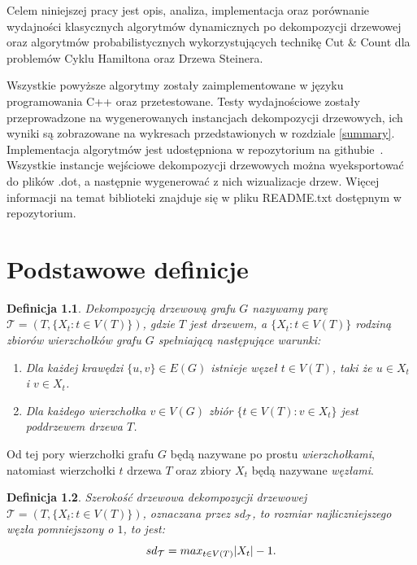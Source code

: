 \documentclass[12pt, oneside]{report}
\newtheorem{definition}{Definicja}
\begin{document}
Celem niniejszej pracy jest opis, analiza, implementacja oraz porównanie wydajności klasycznych algorytmów dynamicznych po dekompozycji drzewowej oraz algorytmów probabilistycznych wykorzystujących technikę Cut \& Count dla problemów Cyklu Hamiltona oraz Drzewa Steinera. 

Wszystkie powyższe algorytmy zostały zaimplementowane w języku programowania C++ oraz przetestowane. Testy wydajnościowe zostały przeprowadzone na wygenerowanych instancjach dekompozycji drzewowych, ich wyniki są zobrazowane na wykresach przedstawionych w rozdziale \ref{summary}. Implementacja algorytmów jest udostępniona w repozytorium na githubie~\cite{github}. Wszystkie instancje wejściowe dekompozycji drzewowych można wyeksportować do plików .dot, a następnie wygenerować z nich wizualizacje drzew. Więcej informacji na temat biblioteki znajduje się w pliku README.txt dostępnym w repozytorium.  

\newpage
  	\chapter{Podstawowe definicje}
  	\label{definitions}
	
\begin{definition}
\em \emph{Dekompozycją drzewową grafu} $G$ nazywamy parę $\mathcal{T} = (T, \{X_t : t \in V(T)\})$, gdzie $T$ jest drzewem, a $\{X_t : t \in V(T)\}$ rodziną zbiorów wierzchołków grafu $G$ spełniającą następujące warunki:
\begin{enumerate}[label=(\roman*)]
	\item{Dla każdej krawędzi $\{u, v\} \in E(G)$ istnieje węzeł $t \in V(T)$, taki że $u \in X_t$ i $v \in X_t$.}
	\item{Dla każdego wierzchołka $v \in V(G)$ zbiór $\{t \in V(T): v \in X_t \}$ jest poddrzewem drzewa $T$.}
\end{enumerate}
\end{definition}

Od tej pory wierzchołki grafu $G$ będą nazywane po prostu \emph{wierzchołkami}, natomiast wierzchołki $t$ drzewa $T$ oraz zbiory $X_t$ będą nazywane \emph{węzłami}.

\begin{definition}
\em \emph{Szerokość drzewowa dekompozycji drzewowej $\mathcal{T}=(T, \{X_t : t \in V(T)\})$}, oznaczana przez $sd_\mathcal{T}$, to rozmiar najliczniejszego węzła pomniejszony o $1$, to jest: $$sd_\mathcal{T} = max_{t \in V(T)} \abs{X_t} - 1.$$ 
\end{definition}
\end{document}
